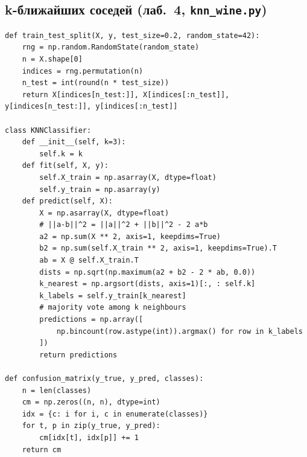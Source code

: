 \documentclass[12pt,a4paper]{article}
\begin{document}
\subsection{k-ближайших соседей (лаб.~4, \texttt{knn\_wine.py})}
\begin{lstlisting}
def train_test_split(X, y, test_size=0.2, random_state=42):
    rng = np.random.RandomState(random_state)
    n = X.shape[0]
    indices = rng.permutation(n)
    n_test = int(round(n * test_size))
    return X[indices[n_test:]], X[indices[:n_test]], y[indices[n_test:]], y[indices[:n_test]]

class KNNClassifier:
    def __init__(self, k=3):
        self.k = k
    def fit(self, X, y):
        self.X_train = np.asarray(X, dtype=float)
        self.y_train = np.asarray(y)
    def predict(self, X):
        X = np.asarray(X, dtype=float)
        # ||a-b||^2 = ||a||^2 + ||b||^2 - 2 a*b
        a2 = np.sum(X ** 2, axis=1, keepdims=True)
        b2 = np.sum(self.X_train ** 2, axis=1, keepdims=True).T
        ab = X @ self.X_train.T
        dists = np.sqrt(np.maximum(a2 + b2 - 2 * ab, 0.0))
        k_nearest = np.argsort(dists, axis=1)[:, : self.k]
        k_labels = self.y_train[k_nearest]
        # majority vote among k neighbours
        predictions = np.array([
            np.bincount(row.astype(int)).argmax() for row in k_labels
        ])
        return predictions

def confusion_matrix(y_true, y_pred, classes):
    n = len(classes)
    cm = np.zeros((n, n), dtype=int)
    idx = {c: i for i, c in enumerate(classes)}
    for t, p in zip(y_true, y_pred):
        cm[idx[t], idx[p]] += 1
    return cm
\end{lstlisting}
\end{document}
